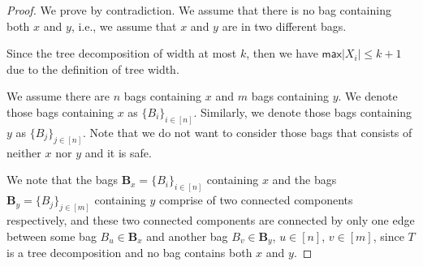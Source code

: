\documentclass{article}
\begin{document}
\begin{proof}
We prove by contradiction. We assume that there is no bag containing both \(x\) and \(y\), i.e., we assume that \(x\) and \(y\) are in two different bags. 



Since the tree decomposition of width at most \(k\), then we have \(\mathsf{max}|X_i| \leq k+1\) due to the definition of tree width. 


We assume there are \(n\) bags containing \(x\) and \(m\) bags containing \(y\). We denote those bags containing \(x\) as \(\{B_i\}_{i \in [n]}\). Similarly, we denote those bags containing \(y\) as \(\{B_j\}_{j \in [n]}\). Note that we do not want to consider those bags that consists of neither \(x\) nor \(y\) and it is safe. 

%

We note that the bags \(\textbf{B}_x=\{B_i\}_{i \in [n]}\) containing \(x\) and the bags \(\textbf{B}_y=\{B_j\}_{j \in [m]}\) containing \(y\) comprise of two connected components respectively, and these two connected components are connected by only one edge between some bag \(B_u \in \textbf{B}_x\) and another bag \(B_v \in \textbf{B}_y\), \(u \in [n]\), \(v \in [m]\), since \(T\) is a tree decomposition and no bag contains both \(x\) and \(y\).


\end{proof}
\end{document}
